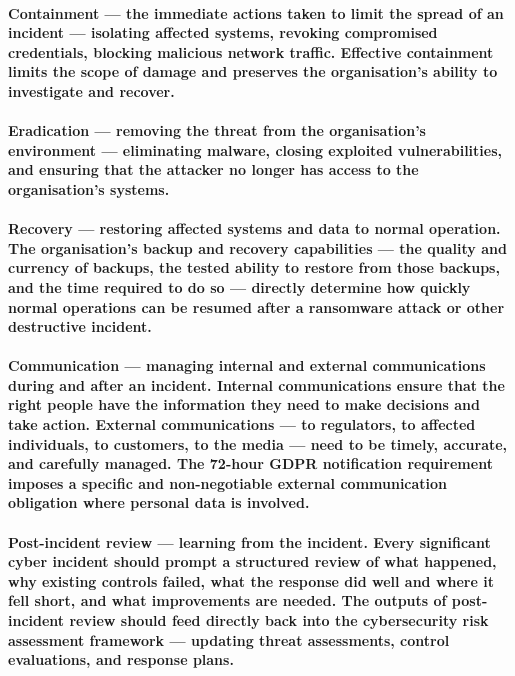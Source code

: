 \paragraph{\textbf{Containment} — the immediate actions taken to limit the spread of an incident — isolating affected systems, revoking compromised credentials, blocking malicious network traffic. Effective containment limits the scope of damage and preserves the organisation's ability to investigate and recover.}
\paragraph{\textbf{Eradication} — removing the threat from the organisation's environment — eliminating malware, closing exploited vulnerabilities, and ensuring that the attacker no longer has access to the organisation's systems.}
\paragraph{\textbf{Recovery} — restoring affected systems and data to normal operation. The organisation's backup and recovery capabilities — the quality and currency of backups, the tested ability to restore from those backups, and the time required to do so — directly determine how quickly normal operations can be resumed after a ransomware attack or other destructive incident.}
\paragraph{\textbf{Communication} — managing internal and external communications during and after an incident. Internal communications ensure that the right people have the information they need to make decisions and take action. External communications — to regulators, to affected individuals, to customers, to the media — need to be timely, accurate, and carefully managed. The 72-hour GDPR notification requirement imposes a specific and non-negotiable external communication obligation where personal data is involved.}
\paragraph{\textbf{Post-incident review} — learning from the incident. Every significant cyber incident should prompt a structured review of what happened, why existing controls failed, what the response did well and where it fell short, and what improvements are needed. The outputs of post-incident review should feed directly back into the cybersecurity risk assessment framework — updating threat assessments, control evaluations, and response plans.}

